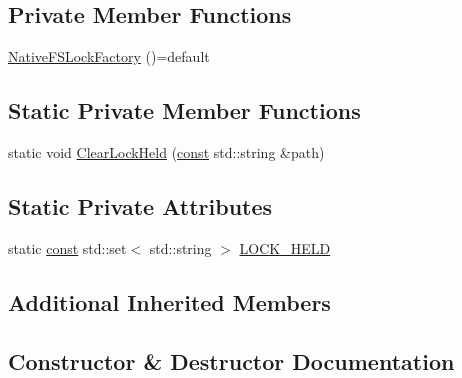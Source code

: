 \subsection*{Private Member Functions}
\begin{DoxyCompactItemize}
\item 
\mbox{\hyperlink{classlucene_1_1core_1_1store_1_1NativeFSLockFactory_a7ba78151a15b05204f56d24a2b89b7af}{Native\+F\+S\+Lock\+Factory}} ()=default
\end{DoxyCompactItemize}
\subsection*{Static Private Member Functions}
\begin{DoxyCompactItemize}
\item 
static void \mbox{\hyperlink{classlucene_1_1core_1_1store_1_1NativeFSLockFactory_a466c2e84bbed2f80402e13a400ecad32}{Clear\+Lock\+Held}} (\mbox{\hyperlink{ZlibCrc32_8h_a2c212835823e3c54a8ab6d95c652660e}{const}} std\+::string \&path)
\end{DoxyCompactItemize}
\subsection*{Static Private Attributes}
\begin{DoxyCompactItemize}
\item 
static \mbox{\hyperlink{ZlibCrc32_8h_a2c212835823e3c54a8ab6d95c652660e}{const}} std\+::set$<$ std\+::string $>$ \mbox{\hyperlink{classlucene_1_1core_1_1store_1_1NativeFSLockFactory_afe6f909fde9f0907977c787d8838dd7b}{L\+O\+C\+K\+\_\+\+H\+E\+LD}}
\end{DoxyCompactItemize}
\subsection*{Additional Inherited Members}


\subsection{Constructor \& Destructor Documentation}
\mbox{\label{classlucene_1_1core_1_1store_1_1NativeFSLockFactory_a7ba78151a15b05204f56d24a2b89b7af}} 
